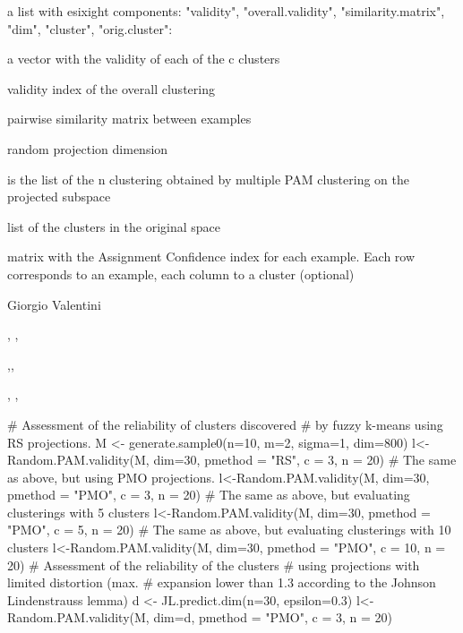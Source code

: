 \documentclass{article}
\begin{document}
\begin{Value}
a list with esixight components: "validity", "overall.validity", "similarity.matrix", "dim", 
"cluster",  "orig.cluster":
\begin{ldescription}
\item[\code{validity }] a vector with the validity of each of the c clusters
\item[\code{overall.validity }] validity index of the overall clustering
\item[\code{similarity.matrix }] pairwise similarity matrix between examples
\item[\code{dimension }] random projection dimension
\item[\code{cluster }] is the list of the n clustering obtained by multiple PAM clustering on the projected subspace
\item[\code{orig.cluster }] list of the clusters in the original space
\item[\code{AC }] matrix with the Assignment Confidence index for each example. Each row corresponds to an example, 
each column to a cluster (optional)
\end{ldescription}
\end{Value}
\begin{Author}\relax
Giorgio Valentini 
\end{Author}
\begin{SeeAlso}\relax
{}, , 

,,

, , 
\end{SeeAlso}
\begin{Examples}
\begin{ExampleCode}
# Assessment of the reliability of clusters discovered 
# by fuzzy k-means using RS projections. 
M <- generate.sample0(n=10, m=2, sigma=1, dim=800)
l<-Random.PAM.validity(M, dim=30, pmethod = "RS", c = 3,  n = 20)
# The same as above, but using PMO projections. 
l<-Random.PAM.validity(M, dim=30, pmethod = "PMO", c = 3, n = 20)
# The same as above, but evaluating clusterings with 5 clusters 
l<-Random.PAM.validity(M, dim=30, pmethod = "PMO", c = 5, n = 20)
# The same as above, but evaluating clusterings with 10 clusters 
l<-Random.PAM.validity(M, dim=30, pmethod = "PMO", c = 10, n = 20)
# Assessment of the reliability of the clusters 
# using projections with limited distortion (max. 
# expansion lower than 1.3 according to the Johnson Lindenstrauss lemma)
d <- JL.predict.dim(n=30, epsilon=0.3)
l<-Random.PAM.validity(M, dim=d, pmethod = "PMO", c = 3, n = 20)

\end{ExampleCode}
\end{Examples}
\end{document}
